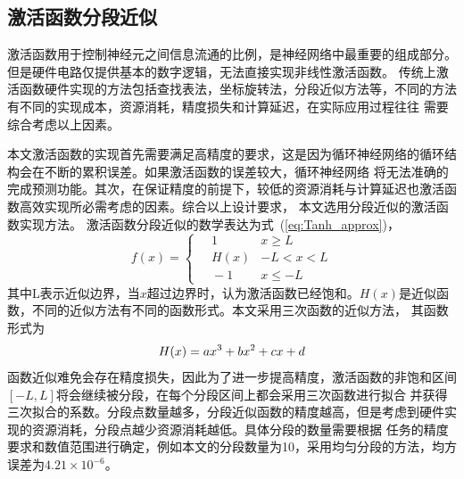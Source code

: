 \subsection{激活函数分段近似}

激活函数用于控制神经元之间信息流通的比例，是神经网络中最重要的组成部分。但是硬件电路仅提供基本的数字逻辑，无法直接实现非线性激活函数。
传统上激活函数硬件实现的方法包括查找表法，坐标旋转法，分段近似方法等，不同的方法有不同的实现成本，资源消耗，精度损失和计算延迟，在实际应用过程往往
需要综合考虑以上因素。

本文激活函数的实现首先需要满足高精度的要求，这是因为循环神经网络的循环结构会在不断的累积误差。如果激活函数的误差较大，循环神经网络
将无法准确的完成预测功能。其次，在保证精度的前提下，较低的资源消耗与计算延迟也激活函数高效实现所必需考虑的因素。综合以上设计要求，
本文选用分段近似的激活函数实现方法。
激活函数分段近似的数学表达为式~(\ref{eq:Tanh_approx})，
\begin{equation}
f(x) = 
  \begin{cases} 
  \quad 1			&  x \geq L \\
  \quad H(x)     	&  -L < x < L	\\
  \quad -1			& 	x\leq -L
  \end{cases}
\label{eq:Tanh_approx}
\end{equation}
其中L表示近似边界，当\(x\)超过边界时，认为激活函数已经饱和。\(H(x)\)是近似函数，不同的近似方法有不同的函数形式。本文采用三次函数的近似方法，
其函数形式为
\begin{equation}
H(x) = ax^3 + bx^2 + cx +d	\\
\end{equation}
函数近似难免会存在精度损失，因此为了进一步提高精度，激活函数的非饱和区间\([-L,L]\)将会继续被分段，在每个分段区间上都会采用三次函数进行拟合
并获得三次拟合的系数。分段点数量越多，分段近似函数的精度越高，但是考虑到硬件实现的资源消耗，分段点越少资源消耗越低。具体分段的数量需要根据
任务的精度要求和数值范围进行确定，例如本文的分段数量为10，采用均匀分段的方法，均方误差为\(4.21 \times 10^{-6}\)。
